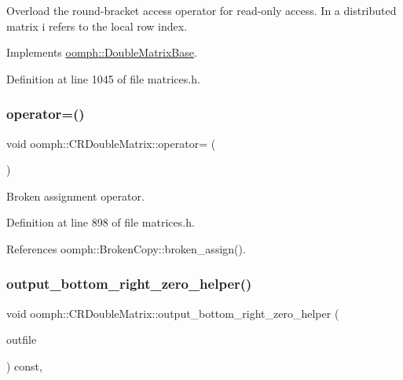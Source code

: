 Overload the round-\/bracket access operator for read-\/only access. In a distributed matrix i refers to the local row index. 

Implements \hyperlink{classoomph_1_1DoubleMatrixBase_a20b85f0286f80464f42f0846fede2d77}{oomph\+::\+Double\+Matrix\+Base}.



Definition at line 1045 of file matrices.\+h.

\mbox{\label{classoomph_1_1CRDoubleMatrix_aab7e1485ecaaebc2846da2882cb96f2f}} 
\subsubsection{\texorpdfstring{operator=()}{operator=()}}
{\footnotesize\ttfamily void oomph\+::\+C\+R\+Double\+Matrix\+::operator= (\begin{DoxyParamCaption}\item[{const \hyperlink{classoomph_1_1CRDoubleMatrix}{C\+R\+Double\+Matrix} \&}]{ }\end{DoxyParamCaption})\hspace{0.3cm}{\ttfamily [inline]}}



Broken assignment operator. 



Definition at line 898 of file matrices.\+h.



References oomph\+::\+Broken\+Copy\+::broken\+\_\+assign().

\mbox{\label{classoomph_1_1CRDoubleMatrix_ab0887b5420752c47bfc14777006bcc1e}} 
\subsubsection{\texorpdfstring{output\+\_\+bottom\+\_\+right\+\_\+zero\+\_\+helper()}{output\_bottom\_right\_zero\_helper()}}
{\footnotesize\ttfamily void oomph\+::\+C\+R\+Double\+Matrix\+::output\+\_\+bottom\+\_\+right\+\_\+zero\+\_\+helper (\begin{DoxyParamCaption}\item[{std\+::ostream \&}]{outfile }\end{DoxyParamCaption}) const\hspace{0.3cm}{\ttfamily [inline]}, {\ttfamily [virtual]}}



